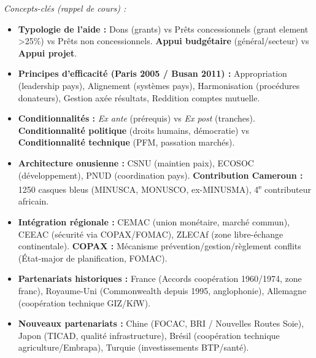 \documentclass[11pt]{article}
\newcommand{\cle}[1]{{\popxbold\color{popdark}#1}}
\newcounter{popsec}
\newcounter{popsub}
\newcommand{\courssub}[1]{%
  \stepcounter{popsub}%
  \par\vspace{9pt}\noindent{\popxbold\fontsize{11.5}{13}\selectfont\color{popink}{\color{poporange}\thepopsec.\thepopsub}\hspace{6pt}#1}\par\nopagebreak\vspace{4pt}
}
\begin{document}
\courssub{Ressources à mobiliser}
\emph{Concepts-clés (rappel de cours) :}
\begin{itemize}
    \item \textbf{Typologie de l'aide :} Dons (grants) vs Prêts concessionnels (grant element \textgreater 25\%) vs Prêts non concessionnels. \textbf{Appui budgétaire} (général/secteur) vs \textbf{Appui projet}.
    \item \textbf{Principes d'efficacité (Paris 2005 / Busan 2011) :} \cle{Appropriation} (leadership pays), \cle{Alignement} (systèmes pays), \cle{Harmonisation} (procédures donateurs), \cle{Gestion axée résultats}, \cle{Reddition comptes mutuelle}.
    \item \textbf{Conditionnalités :} \emph{Ex ante} (prérequis) vs \emph{Ex post} (tranches). \textbf{Conditionnalité politique} (droits humains, démocratie) vs \textbf{Conditionnalité technique} (PFM, passation marchés).
    \item \textbf{Architecture onusienne :} CSNU (maintien paix), ECOSOC (développement), PNUD (coordination pays). \textbf{Contribution Cameroun :} \num{1250} casques bleus (MINUSCA, MONUSCO, ex-MINUSMA), 4\textsuperscript{e} contributeur africain.
    \item \textbf{Intégration régionale :} CEMAC (union monétaire, marché commun), CEEAC (sécurité via COPAX/FOMAC), ZLECAf (zone libre-échange continentale). \textbf{COPAX :} Mécanisme prévention/gestion/règlement conflits (État-major de planification, FOMAC).
    \item \textbf{Partenariats historiques :} France (Accords coopération 1960/1974, zone franc), Royaume-Uni (Commonwealth depuis 1995, anglophonie), Allemagne (coopération technique GIZ/KfW).
    \item \textbf{Nouveaux partenariats :} Chine (FOCAC, BRI / Nouvelles Routes Soie), Japon (TICAD, qualité infrastructure), Brésil (coopération technique agriculture/Embrapa), Turquie (investissements BTP/santé).
\end{itemize}
\end{document}
